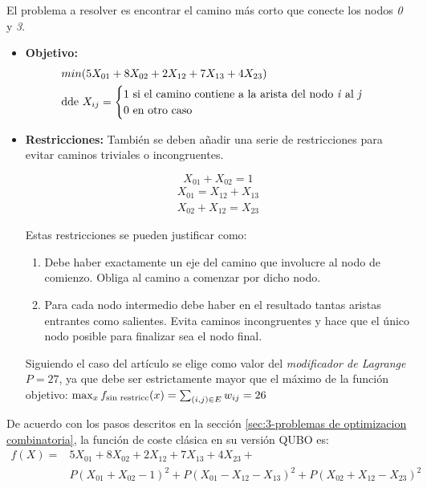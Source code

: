 \documentclass{article}
\begin{document}
El problema a resolver es encontrar el camino más corto que conecte los nodos \textit{0} y \textit{3}.
\begin{itemize}
\item \textbf{Objetivo:}
  \begin{align*}
    &min(5X_{01} + 8X_{02} + 2X_{12} + 7X_{13} + 4X_{23}) \\
    &\textnormal{dde } X_{ij} = \begin{cases}
      1 \textnormal{ si el camino contiene a la arista del nodo \textit{i} al \textit{j}} \\
      0 \textnormal{ en otro caso}
    \end{cases}
  \end{align*}
  
\item \textbf{Restricciones:}
  También se deben añadir una serie de restricciones para evitar caminos triviales o incongruentes.

  \begin{equation}
    X_{01} + X_{02} = 1
  \end{equation}
  \begin{equation}
    \begin{split}
      X_{01} = X_{12} + X_{13} \\
      X_{02} + X_{12} = X_{23}
    \end{split}
  \end{equation}

  Estas restricciones se pueden justificar como:
  \begin{enumerate}
  \item Debe haber exactamente un eje del camino que involucre al nodo de comienzo. Obliga al camino a comenzar por dicho nodo.
  \item Para cada nodo intermedio debe haber en el resultado tantas aristas entrantes como salientes. Evita caminos incongruentes y hace que el único nodo posible para finalizar sea el nodo final.
    
  \end{enumerate}
  Siguiendo el caso del artículo se elige como valor del \textit{modificador de Lagrange} \(P=27\), ya que debe ser estrictamente mayor que el máximo de la función objetivo:
  \(\max_{x}{f_{\textnormal{sin restricc}}(x)} = \sum_{(i, j)\in{E}}{w_{ij}} = 26\)

\end{itemize}

De acuerdo con los pasos descritos en la sección \ref{sec:3-problemas de optimizacion combinatoria},  %
la función de coste clásica en su versión QUBO es:
\begin{align*}
  f(X) = &5X_{01} + 8X_{02} + 2X_{12} + 7X_{13} + 4X_{23} + &&\\
         &P(X_{01} + X_{02} - 1)^2 + P(X_{01} - X_{12} - X_{13})^2 + P(X_{02} + X_{12} - X_{23})^2
\end{align*}
\end{document}
